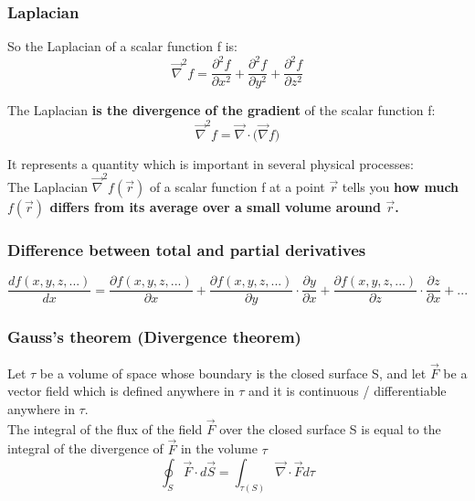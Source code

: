 \documentclass[english,11pt]{article}
\begin{document}
\subsubsection*{\bf Laplacian}

So the Laplacian of a scalar function f is:
\begin{equation*}
  \vec{\nabla}^{2}f = \frac{\partial^2 f}{\partial x^2} + \frac{\partial^2 f}{\partial y^2} + \frac{\partial^2 f}{\partial z^2}
\end{equation*}

The Laplacian {\bf is the divergence of the gradient} of the scalar function f:
\begin{equation*}
  \vec{\nabla}^{2} f =  \vec{\nabla} \cdot \Big( \vec{\nabla} f \Big)
\end{equation*}

It represents a quantity which is important in several physical processes:\\
The Laplacian $\vec{\nabla}^{2} f(\vec{r})$ of a scalar function f at a point $\vec{r}$
tells you {\bf how much $f(\vec{r})$ differs from its average over a small volume around $\vec{r}$.}

\subsubsection*{\bf Difference between total and partial derivatives}
\begin{equation*}
   \frac{df(x,y,z,...)}{dx} =
     \frac{\partial f(x,y,z,...)}{\partial x} +
     \frac{\partial f(x,y,z,...)}{\partial y} \cdot \frac{\partial y}{\partial x} +
     \frac{\partial f(x,y,z,...)}{\partial z} \cdot \frac{\partial z}{\partial x} + ...
\end{equation*}

\subsubsection*{\bf Gauss's theorem (Divergence theorem)}
Let $\tau$ be a volume of space whose boundary is the closed surface S,
and let $\vec{F}$ be a vector field which is defined anywhere in $\tau$
and it is continuous / differentiable anywhere in $\tau$.\\
The integral of the flux of the field $\vec{F}$ over the closed surface S is
equal to the integral of the divergence of $\vec{F}$ in the volume $\tau$\\
\begin{equation*}
  \oint_{S} \vec{F} \cdot d\vec{S} = \int_{\tau(S)} \vec{\nabla} \cdot \vec{F} d\tau
\end{equation*}
\end{document}
